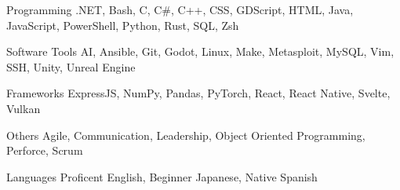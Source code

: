 


\begin{cvskills}

  \cvskill
    {Programming} %
    {.NET, Bash, C, C\#, C++, CSS, GDScript, HTML, Java, JavaScript, PowerShell, Python, Rust, SQL, Zsh}

  \cvskill
    {Software Tools} %
    {AI, Ansible, Git, Godot, Linux, Make, Metasploit, MySQL, Vim, SSH, Unity, Unreal Engine}

  \cvskill
    {Frameworks} %
    {ExpressJS, NumPy, Pandas, PyTorch, React, React Native, Svelte, Vulkan}

  \cvskill
    {Others} %
    {Agile, Communication, Leadership, Object Oriented Programming, Perforce, Scrum}

  \cvskill
    {Languages} %
    {Proficent English, Beginner Japanese, Native Spanish}

\end{cvskills}
